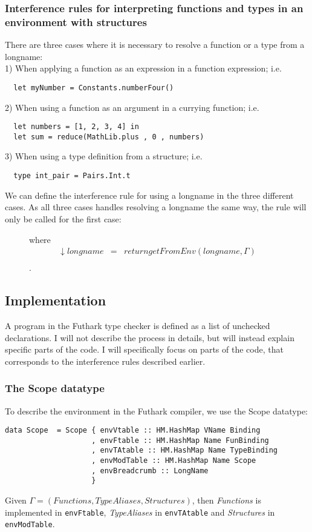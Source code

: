 \subsubsection{Interference rules for interpreting functions and types in an
  environment with structures}\label{interpretingfunctionsandtypeswithstructures}
There are three cases where it is necessary to resolve a function or a type from a
longname:\\
1) When applying a function as an expression in a function expression; i.e.
\begin{verbatim}
  let myNumber = Constants.numberFour()
\end{verbatim}
2) When using a function as an argument in a currying function; i.e.
\begin{verbatim}
  let numbers = [1, 2, 3, 4] in
  let sum = reduce(MathLib.plus , 0 , numbers)
\end{verbatim}
3) When using a type definition from a structure; i.e.
\begin{verbatim}
  type int_pair = Pairs.Int.t 
\end{verbatim}
We can define the interference rule for using a longname in the three different
cases. As all three cases handles resolving a longname the same way, the rule
will only be called for the first case:
\begin{figure}\label{Rule5}
  \begin{prooftree}
  \end{prooftree}
  where
  \begin{align*}
    \downarrow longname & = & return getFromEnv(longname , \Gamma) \\
  \end{align*}.
\end{figure}
\subsection{Implementation}
A program in the Futhark type checker is defined as a list of unchecked
declarations.
I will not describe the process in details, but will instead
explain specific parts of the code.
I will specifically focus on parts of the code, that corresponds to the
interference rules described earlier.
\\
\subsubsection{The Scope datatype}
To describe the environment in the Futhark compiler, we use the Scope datatype:
\begin{verbatim}
data Scope  = Scope { envVtable :: HM.HashMap VName Binding
                    , envFtable :: HM.HashMap Name FunBinding
                    , envTAtable :: HM.HashMap Name TypeBinding
                    , envModTable :: HM.HashMap Name Scope
                    , envBreadcrumb :: LongName
                    }
\end{verbatim}
Given $\Gamma = (Functions, TypeAliases, Structures)$, then \textit{Functions} is
implemented in \texttt{envFtable}, \textit{TypeAliases} in \texttt{envTAtable} and \textit{Structures} in \texttt{envModTable}.
